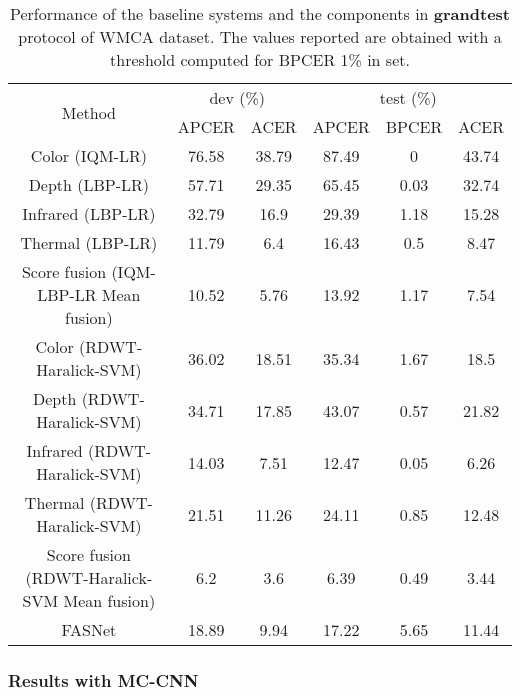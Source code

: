 \documentclass[journal]{IEEEtran}
\begin{document}
\begin{table*}[t]
\centering
\caption{Performance of the baseline systems and the components in \textbf{grandtest} protocol of WMCA dataset. The values reported are obtained with a threshold computed for BPCER 1\% in  set.}
\label{tab:baseline_results}
\begin{tabular}{@{}ccc|ccc@{}}
\toprule
\multirow{2}{*}{Method} & \multicolumn{2}{c|}{dev (\%)}     & \multicolumn{3}{c}{test (\%)}                                  \\ \cmidrule(l){2-6}
                        & \multicolumn{1}{c|}{APCER} & ACER & \multicolumn{1}{c|}{APCER} & \multicolumn{1}{c|}{BPCER} & ACER  \\ \midrule

Color (IQM-LR)         &76.58  &38.79  &87.49     &0  &43.74\\
Depth (LBP-LR)         &57.71  &29.35  &65.45  &0.03  &32.74\\
Infrared (LBP-LR)       &32.79  &16.9  &29.39  &1.18  &15.28\\
Thermal (LBP-LR)        &11.79  &6.4  &16.43   &0.5  &8.47 \\
Score fusion (IQM-LBP-LR Mean fusion)  &10.52  &5.76  &13.92  &1.17  &7.54 \\ \hline
Color (RDWT-Haralick-SVM) &36.02  &18.51  &35.34  &1.67  &18.5\\
Depth (RDWT-Haralick-SVM) &34.71  &17.85  &43.07  &0.57  &21.82\\
Infrared (RDWT-Haralick-SVM)&14.03  &7.51  &12.47  &0.05  &6.26 \\
Thermal (RDWT-Haralick-SVM) &21.51  &11.26  &24.11  &0.85  &12.48 \\
Score fusion (RDWT-Haralick-SVM Mean fusion)  &6.2  &3.6  &6.39  &0.49  &3.44 \\\hline
FASNet &18.89  &9.94  &17.22  &5.65  &11.44 \\ \bottomrule
\end{tabular}
\end{table*}





\subsubsection{Results with MC-CNN}
\end{document}
